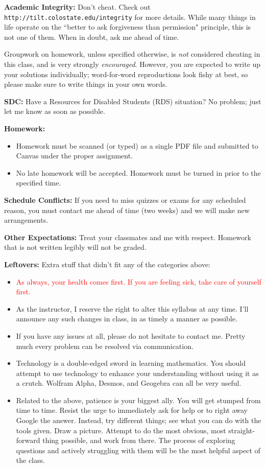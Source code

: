 \documentclass[12pt]{amsbook}
\begin{document}
\textbf{Academic Integrity:} Don't cheat. Check out \texttt{http://tilt.colostate.edu/integrity} for more details. While many things in life operate on the ``better to ask forgiveness than permission" principle, this is not one of them. When in doubt, ask me ahead of time.

Groupwork on homework, unless specified otherwise, is \emph{not} considered cheating in this class, and is very strongly \emph{encouraged}. However, you are expected to write up your solutions individually; word-for-word reproductions look fishy at best, so please make sure to write things in your own words.

\textbf{SDC:} Have a Resources for Disabled Students (RDS) situation? No problem; just let me know as soon as possible.

\textbf{Homework:} 
\begin{itemize}
    \item Homework must be scanned (or typed) as a single PDF file and submitted to Canvas under the proper assignment.
    \item No late homework will be accepted.  Homework must be turned in prior to the specified time.
\end{itemize}

\textbf{Schedule Conflicts:} If you need to miss quizzes or exams for any scheduled reason, you must contact me ahead of time (two weeks) and we will make new arrangements. 

\textbf{Other Expectations:} Treat your classmates and me with respect. Homework that is not written legibly will not be graded.

\textbf{Leftovers:} Extra stuff that didn't fit any of the categories above:
\begin{itemize}
\item \textcolor{red}{As always, your health comes first.  If you are feeling sick, take care of yourself first.}
\item As the instructor, I reserve the right to alter this syllabus at any time. I'll announce any such changes in class, in as timely a manner as possible. 
\item If you have any issues at all, please do not hesitate to contact me. Pretty much every  problem can be resolved via communication.
\item Technology is a double-edged sword in learning mathematics. You should attempt to use technology to enhance your understanding without using it as a crutch. Wolfram Alpha, Desmos, and Geogebra can all be very useful. 
\item Related to the above, patience is your biggest ally. You will get stumped from time to time. Resist the urge to immediately ask for help or to right away Google the answer. Instead, try different things; see what you can do with the tools given. Draw a picture. Attempt to do the most obvious, most straight-forward thing possible, and work from there. The process of exploring questions and actively struggling with them will be the most helpful aspect of the class.
\end{itemize}
\end{document}
